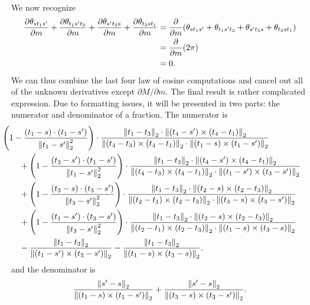 \begin{itemize}
	We now recognize \begin{align*}
		\frac{\partial\theta_{st_1s'}}{\partial m} + \frac{\partial\theta_{t_1s't_3}}{\partial m} + \frac{\partial\theta_{s't_3s}}{\partial m} + \frac{\partial\theta_{t_3st_1}}{\partial m} &= \frac{\partial}{\partial m}\pof{\theta_{st_1s'} + \theta_{t_1s't_3} + \theta_{s't_3s} + \theta_{t_3st_1}} \\
			&= \frac{\partial}{\partial m}\pof{2\pi} \\
			&= 0.
	\end{align*} We can thus combine the last four law of cosine computations and cancel out all of the unknown derivatives except \(\partial M / \partial m\). The final result is rather complicated expression. Due to formatting issues, it will be presented in two parts: the numerator and denominator of a fraction. The numerator is \begin{align*}
		&\hspace{-2em}\pof{1 - \frac{\pof{t_1 - s} \cdot \pof{t_1 - s'}}{\norm{t_1 - s'}_2^2}} \cdot \frac{\norm{t_1 - t_3}_2 \cdot \norm{\pof{t_4 - s'} \times \pof{t_4 - t_1}}_2}{\norm{\pof{t_4 - t_3} \times \pof{t_4 - t_1}}_2 \cdot \norm{\pof{t_1 - s} \times \pof{t_1 - s'}}_2} \\
		&+ \pof{1 - \frac{\pof{t_3 - s'} \cdot \pof{t_1 - s'}}{\norm{t_1 - s'}_2^2}} \cdot \frac{\norm{t_1 - t_3}_2 \cdot \norm{\pof{t_4 - s'} \times \pof{t_4 - t_1}}_2}{\norm{\pof{t_4 - t_3} \times \pof{t_4 - t_1}}_2 \cdot \norm{\pof{t_1 - s'} \times \pof{t_3 - s'}}_2} \\
		&+ \pof{1 - \frac{\pof{t_3 - s} \cdot \pof{t_3 - s'}}{\norm{t_3 - s'}_2^2}} \cdot \frac{\norm{t_1 - t_3}_2 \cdot \norm{\pof{t_2 - s} \times \pof{t_2 - t_3}}_2}{\norm{\pof{t_2 - t_1} \times \pof{t_2 - t_3}}_2 \cdot \norm{\pof{t_3 - s} \times \pof{t_3 - s'}}_2} \\
		&+ \pof{1 - \frac{\pof{t_1 - s'} \cdot \pof{t_3 - s'}}{\norm{t_3 - s'}_2^2}} \cdot \frac{\norm{t_1 - t_3}_2 \cdot \norm{\pof{t_2 - s} \times \pof{t_2 - t_3}}_2}{\norm{\pof{t_2 - t_1} \times \pof{t_2 - t_3}}_2 \cdot \norm{\pof{t_1 - s} \times \pof{t_3 - s}}_2} \\
		&- \frac{\norm{t_1 - t_3}_2}{\norm{\pof{t_1 - s'} \times \pof{t_3 - s'}}_2} - \frac{\norm{t_1 - t_3}_2}{\norm{\pof{t_1 - s} \times \pof{t_3 - s}}_2}.
	\end{align*} and the denominator is \[\frac{\norm{s' - s}_2}{\norm{\pof{t_1 - s} \times \pof{t_1 - s'}}_2} + \frac{\norm{s' - s}_2}{\norm{\pof{t_3 - s} \times \pof{t_3 - s'}}_2}.\]


\end{itemize}

